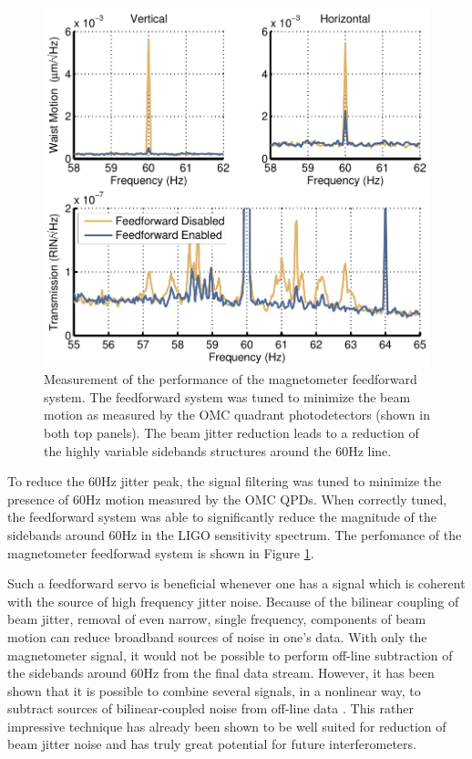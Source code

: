\begin{figure}
  \begin{center}
  \leavevmode
  \includegraphics{figs-jitter/magffperformance.pdf}
  \end{center}
  \caption[Measurement of the performance of the magnetometer feedforward system.]{Measurement of the performance of the magnetometer feedforward system. The feedforward system was tuned to minimize the beam motion as measured by the OMC quadrant photodetectors (shown in both top panels). The beam jitter reduction leads to a reduction of the highly variable sidebands structures around the 60Hz line.}
  \label{fig:magffperformance}
\end{figure}

To reduce the 60Hz jitter peak, the signal filtering was tuned to minimize the presence of 60Hz motion measured by the OMC QPDs. %
When correctly tuned, the feedforward system was able to significantly reduce the magnitude of the sidebands around 60Hz in the LIGO sensitivity spectrum. %
The perfomance of the magnetometer feedforwad system is shown in Figure \ref{fig:magffperformance}.

Such a feedforward servo is beneficial whenever one has a signal which is coherent with the source of high frequency jitter noise. %
Because of the bilinear coupling of beam jitter, removal of even narrow, single frequency, components of beam motion can reduce broadband sources of noise in one's data. %
With only the magnetometer signal, it would not be possible to perform off-line subtraction of the sidebands around 60Hz from the final data stream. %
However, it has been shown that it is possible to combine several signals, in a nonlinear way, to subtract sources of bilinear-coupled noise from off-line data \cite{G1200197,G1200288}. %
This rather impressive technique has already been shown to be well suited for reduction of beam jitter noise and has truly great potential for future interferometers.

